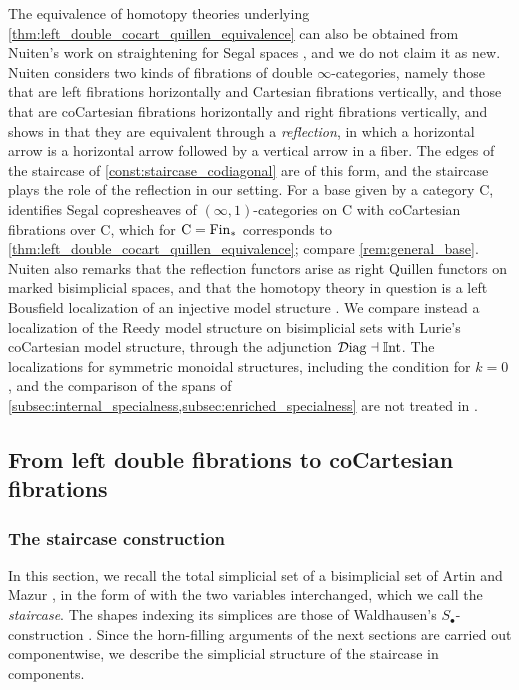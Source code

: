 \documentclass[10pt,reqno]{amsart}
\begin{document}
\begin{rmk}%
\label{rem:nuiten_dictionary}
The equivalence of homotopy theories underlying
\cref{thm:left_double_cocart_quillen_equivalence} can also be obtained
from Nuiten's work on straightening for Segal spaces
\cite{Nuiten2023}, and we do not claim it as new. Nuiten considers two
kinds of fibrations of double $\infty$-categories, namely those that
are left fibrations horizontally and Cartesian fibrations vertically,
and those that are coCartesian fibrations horizontally and right
fibrations vertically, and shows in \cite[Theorem~3.1]{Nuiten2023}
that they are equivalent through a \emph{reflection}, in which a
horizontal arrow is a horizontal arrow followed by a vertical arrow in
a fiber. The edges of the staircase of
\cref{const:staircase_codiagonal} are of this form, and the staircase
plays the role of the reflection in our setting. For a base given by
a category $\mathrm C$, \cite[Corollary~4.35]{Nuiten2023} identifies
Segal copresheaves of $(\infty,1)$-categories on $\mathrm C$ with
coCartesian fibrations over $\mathrm C$, which for
$\mathrm C=\mathrm{Fin}_*$ corresponds to
\cref{thm:left_double_cocart_quillen_equivalence}; compare
\cref{rem:general_base}. Nuiten also remarks that the reflection
functors arise as right Quillen functors on marked bisimplicial
spaces, and that the homotopy theory in question is a left Bousfield
localization of an injective model structure
\cite[Remarks~3.2 and~3.9]{Nuiten2023}. We compare instead a
localization of the Reedy model structure on bisimplicial sets with
Lurie's coCartesian model structure, through the adjunction
$\mathcal{D}\mathrm{iag}\dashv\mathbb{I}\mathrm{nt}$. The localizations for symmetric monoidal
structures, including the condition for $k=0$, and the comparison of
the spans of
\cref{subsec:internal_specialness,subsec:enriched_specialness} are not
treated in \cite{Nuiten2023}.
\end{rmk}

\subsection{From left double fibrations to coCartesian fibrations}
\label{subsec:comparison_internal_to_enriched}
\subsubsection{The staircase construction}

In this section, we recall the total simplicial set of a bisimplicial
set of Artin and Mazur \cite{ArtinMazur1966VanKampen}, in the form of
\cite[Definition~3.1]{Stevenson2025TotalSimplicialSet} with the two
variables interchanged, which we call the \emph{staircase}. The shapes
indexing its simplices are those of Waldhausen's
$S_\bullet$-construction
\cite{Waldhausen1985Spaces,BergnerEtAl2021TwoSegalObjects}. Since the
horn-filling arguments of the next sections are carried out
componentwise, we describe the simplicial structure of the staircase
in components.
\end{document}
